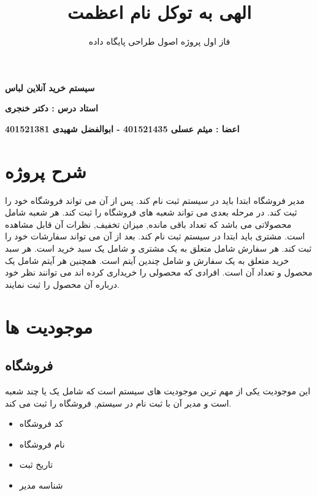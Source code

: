 \documentclass[]{article}
\title{ الهی به توکل نام اعظمت  }
\author{
فاز اول پروژه اصول طراحی پایگاه داده
 }
\begin{document}
\maketitle

\begin{center}
\textbf{سیستم خرید آنلاین لباس}
\end{center}

\begin{center}
\textbf{ استاد درس : دکتر خنجری   }
\end{center}
\begin{center}
\textbf{ اعضا : میثم عسلی 401521435 - ابوالفضل شهیدی 401521381}
\end{center}

\newpage
\tableofcontents
\newpage
\section{شرح پروژه}
مدیر فروشگاه ابتدا باید در سیستم ثبت نام کند. پس از آن می تواند فروشگاه خود را ثبت کند. در مرحله بعدی می تواند شعبه های فروشگاه را ثبت کند. هر شعبه شامل محصولاتی می باشد که تعداد باقی مانده, میزان تخفیف, نظرات آن قابل مشاهده است. 
مشتری باید ابتدا در سیستم ثبت نام کند. بعد از آن می تواند سفارشات خود را ثبت کند.
هر سفارش شامل متعلق به یک مشتری و شامل یک سبد خرید است. 
هر سبد خرید متعلق به یک سفارش و شامل چندین آیتم است.
همچنین هر آیتم شامل یک محصول و تعداد آن است.
افرادی که محصولی را خریداری کرده اند می توانند نظر خود درباره آن محصول را ثبت نمایند. 


\section{موجودیت ها}



\subsection{فروشگاه}
این موجودیت یکی از مهم ترین موجودیت های سیستم است که شامل یک یا چند شعبه است و مدیر آن با ثبت نام در سیستم, فروشگاه را ثبت می کند.
\begin{itemize}
\item کد فروشگاه
\item نام فروشگاه
\item تاریخ ثبت  
\item شناسه مدیر

\end{itemize}
\end{document}
